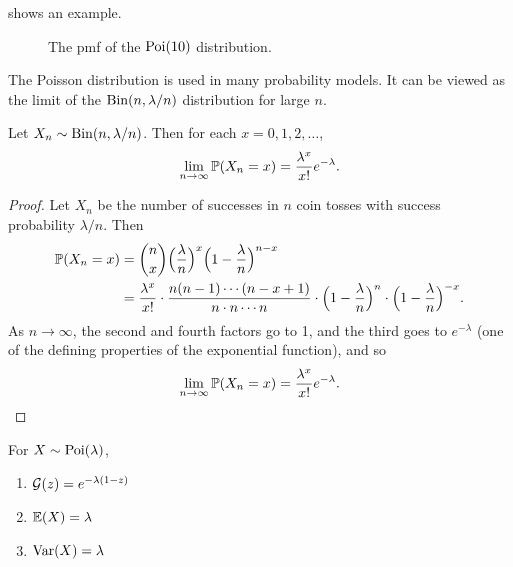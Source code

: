  shows an example.

\begin{figure}[H]
\centering
{}
\caption{The pmf of the $\mathrm{Poi}(10)$ distribution.}
\label{fig:poisson-pmf}
\end{figure}


The Poisson distribution is used in many probability models. It can be viewed as the limit of the $\mathrm{Bin}(n, \lambda/n)$ distribution for large $n$.

\begin{theorem}\label{thm:poisson-limit}
Let $X_n \sim \mathrm{Bin}(n, \lambda/n)$. Then for each $x = 0, 1, 2, \ldots$,
\[
  \lim_{n \to \infty} \mathbb{P}(X_n = x) = \frac{\lambda^x}{x!} e^{-\lambda}.
\]
\end{theorem}

\begin{proof}
Let $X_n$ be the number of successes in $n$ coin tosses with success probability $\lambda/n$. Then
\begin{align*}
  \mathbb{P}(X_n = x) &= \binom{n}{x} \Bigl(\frac{\lambda}{n}\Bigr)^x \Bigl(1 - \frac{\lambda}{n}\Bigr)^{n-x} \\
  &= \frac{\lambda^x}{x!} \cdot \frac{n(n-1)\cdots(n-x+1)}{n \cdot n \cdots n} \cdot \Bigl(1 - \frac{\lambda}{n}\Bigr)^n \cdot \Bigl(1 - \frac{\lambda}{n}\Bigr)^{-x}.
\end{align*}
As $n \to \infty$, the second and fourth factors go to 1, and the third goes to $e^{-\lambda}$ (one of the defining properties of the exponential function), and so
\[
  \lim_{n \to \infty} \mathbb{P}(X_n = x) = \frac{\lambda^x}{x!} e^{-\lambda}. \qedhere
\]
\end{proof}

\begin{theorem}\label{thm:poisson-properties}
For $X \sim \mathrm{Poi}(\lambda)$,
\begin{enumerate}
  \item $\mathcal{G}(z) = e^{-\lambda(1-z)}$
  \item $\operatorname{\mathbb{E}}(X) = \lambda$
  \item $\operatorname{Var}(X) = \lambda$
\end{enumerate}
\end{theorem}

